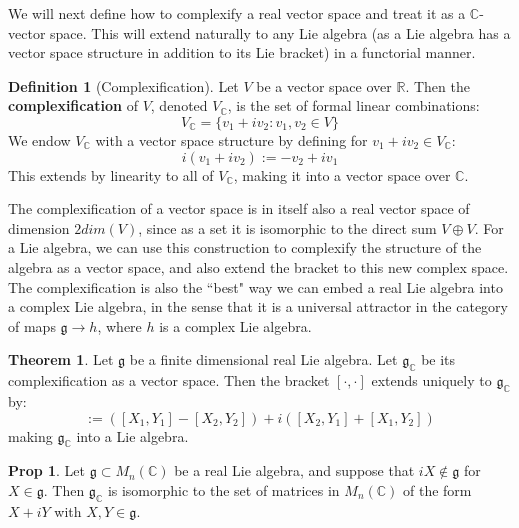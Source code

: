 \documentclass[11pt, oneside]{article}   	%
\theoremstyle{definition}
\newtheorem{definition}{Definition}[section]
\newtheorem{theorem}{Theorem}[section]
\newtheorem{prop}{Prop}[section]
\begin{document}
We will next define how to complexify a real vector space and treat it as a $\mathbb C$-vector space. This 
will extend naturally to any Lie algebra (as a Lie algebra has a vector space structure in addition to its Lie 
bracket) in a functorial manner. 
\begin{definition}[Complexification]
	Let $V$ be a vector space over $\mathbb R$. Then the \textbf{complexification} of $V$, denoted $V_\mathbb{C}$, is the 
	set of formal linear combinations:
	\begin{equation}
		V_\mathbb{C} = \{v_1 + iv_2 : v_1, v_2\in V\}
	\end{equation}
	We endow $V_\mathbb{C}$ with a vector space structure by defining for $v_1 + iv_2\in V_\mathbb{C}$:
	\begin{equation}
		i(v_1 + iv_2) := -v_2 + iv_1
	\end{equation}
	This extends by linearity to all of $V_\mathbb{C}$, making it into a vector space over $\mathbb C$. 
\end{definition}

The complexification of a vector space is in itself also a real vector space of dimension $2dim(V)$, since as a set it is 
isomorphic to the direct sum $V\oplus V$. For a Lie algebra, we can use this construction to complexify the structure of the 
algebra as a vector space, and also extend the bracket to this new complex space. The complexification is also the ``best" way 
we can embed a real Lie algebra into a complex Lie algebra, in the sense that it is a universal attractor in the category of maps 
$\mathfrak g\rightarrow h$, where $h$ is a complex Lie algebra. 

\begin{theorem}
	Let $\mathfrak g$ be a finite dimensional real Lie algebra. Let $\mathfrak g_\mathbb{C}$ be its complexification as a 
	vector space. Then the bracket $[\cdot, \cdot]$ extends uniquely to $\mathfrak g_\mathbb{C}$ by:
	\begin{equation}
		[X_1 + iX_2, Y_1 + iY_2] := ([X_1, Y_1] - [X_2, Y_2]) + i([X_2, Y_1] + [X_1, Y_2])
	\end{equation}
	making $\mathfrak g_\mathbb{C}$ into a Lie algebra. 
\end{theorem}

\begin{prop}
	Let $\mathfrak g\subset M_n(\mathbb C)$ be a real Lie algebra, and suppose that $iX\not\in\mathfrak g$ for $X\in
	\mathfrak g$. Then $\mathfrak g_\mathbb{C}$ is isomorphic to the set of matrices in $M_n(\mathbb C)$ of the form 
	$X + iY$ with $X, Y\in\mathfrak g$. 
\end{prop}
\end{document}
